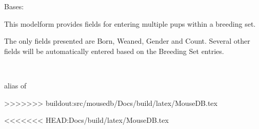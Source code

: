 \documentclass[letterpaper,10pt,english]{sphinxmanual}
\begin{document}
\begin{fulllineitems}
\label{api:animal.forms.MultipleBreedingAnimalForm}
Bases: 

This modelform provides fields for entering multiple pups within a breeding set.

The only fields presented are Born, Weaned, Gender and Count.  Several other fields will be automatically entered based on the Breeding Set entries.

\begin{fulllineitems}
\label{api:animal.forms.MultipleBreedingAnimalForm.Meta}~

\begin{fulllineitems}
\label{api:animal.forms.MultipleBreedingAnimalForm.Meta.model}
alias of 

\end{fulllineitems}


\end{fulllineitems}


\begin{fulllineitems}
\label{api:animal.forms.MultipleBreedingAnimalForm.media}
\end{fulllineitems}
>>>>>>> buildout:src/mousedb/Docs/build/latex/MouseDB.tex


\end{fulllineitems}

<<<<<<< HEAD:Docs/build/latex/MouseDB.tex
\end{document}
